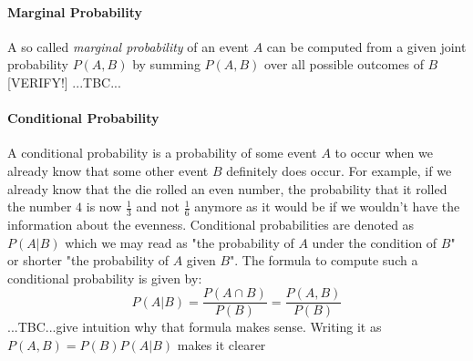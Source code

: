 % 




\paragraph{Marginal Probability}
A so called \emph{marginal probability} of an event $A$ can be computed from a given joint probability $P(A,B)$ by summing $P(A,B)$ over all possible outcomes of $B$ [VERIFY!] ...TBC...


\paragraph{Conditional Probability}
A conditional probability is a probability of some event $A$ to occur when we already know that some other event $B$ definitely does occur. For example, if we already know that the die rolled an even number, the probability that it rolled the number $4$ is now $\frac{1}{3}$ and not $\frac{1}{6}$ anymore as it would be if we wouldn't have the information about the evenness. Conditional probabilities are denoted as $P(A|B)$ which we may read as "the probability of $A$ under the condition of $B$" or shorter "the probability of $A$ given $B$". The formula to compute such a conditional probability is given by:
\begin{equation}
\label{Eq:ConditionalProbability}
 P(A|B) = \frac{P(A \cap B)}{P(B)} = \frac{P(A, B)}{P(B)}
\end{equation}
...TBC...give intuition why that formula makes sense. Writing it as $P(A,B) = P(B) P(A|B)$ makes it clearer









